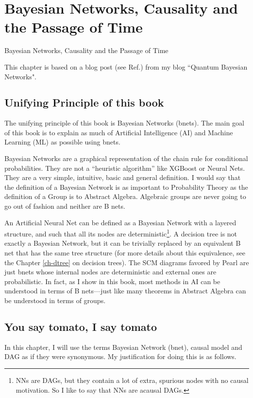 \chapter*{Bayesian Networks, Causality and the
Passage of Time}
{Bayesian Networks, Causality and the
Passage of Time}

\label{ch-passage-time}

This chapter is based
on a blog post (see Ref.\cite{bnets-passage-time})
from my blog ``Quantum Bayesian Networks".

\section{Unifying Principle of this book}
The unifying principle of this
book is Bayesian Networks (bnets).
The main goal of this book
is to explain
as much of Artificial Intelligence (AI)
and Machine Learning (ML)
as possible
using bnets.

Bayesian Networks are a graphical representation of the chain rule for
conditional probabilities.
 They are not a ``heuristic algorithm” like XGBoost or Neural Nets.
They are a very simple, intuitive, basic and general definition. I would say
that the definition of a Bayesian Network is as important to Probability
Theory as the definition of a Group is to Abstract Algebra. Algebraic groups
are never going to go out of fashion and neither are B nets.

An Artificial Neural Net can be defined as a Bayesian Network with a layered
structure, and such that all its nodes are deterministic\footnote{NNs
are DAGs, but they contain a lot of extra,
spurious nodes with no causal motivation. So I like to
say that NNs are acausal DAGs.}. A decision tree
is not exactly a Bayesian Network, but it can be trivially replaced by an
equivalent B net that has the same tree structure (for more details about
this equivalence, see the Chapter \ref{ch-dtree} on decision trees).
The SCM diagrams favored by Pearl are just bnets
whose internal nodes are deterministic and external ones
are probabilistic.
In fact, as I show in this book, most methods in AI can be
understood in terms of B nets---just
like many theorems in Abstract Algebra
can be understood in terms of groups.



\section{You say tomato, I say tomato}
In this chapter, I will use the terms Bayesian Network
(bnet), causal model and DAG as if they were synonymous.
My justification for doing this is as follows.


